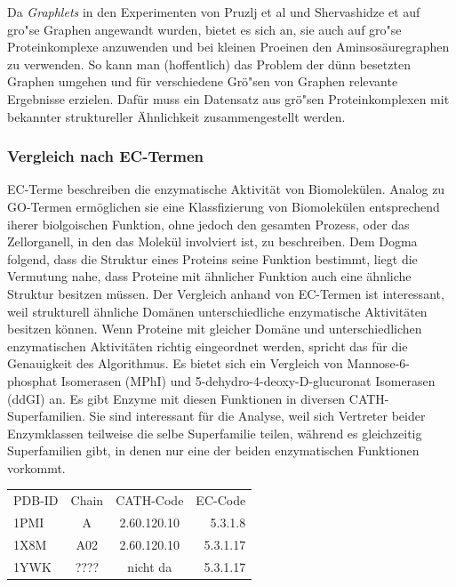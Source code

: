\documentclass{report}
\begin{document}
Da \textit{Graphlets} in den Experimenten von Pruzlj et al und Shervashidze et auf gro"se Graphen angewandt wurden, bietet es sich an, sie auch auf gro"se Proteinkomplexe anzuwenden und bei kleinen Proeinen den Aminsos\"auregraphen zu verwenden. So kann man (hoffentlich) das Problem der d\"unn besetzten Graphen umgehen und f\"ur verschiedene Gr\"o"sen von Graphen relevante Ergebnisse erzielen. Daf\"ur muss ein Datensatz aus gr\"o"sen Proteinkomplexen mit bekannter struktureller \"Ahnlichkeit zusammengestellt werden.

\subsubsection{Vergleich nach EC-Termen}

EC-Terme beschreiben die enzymatische Aktivit\"at von Biomolek\"ulen. Analog zu GO-Termen erm\"oglichen sie eine Klassfizierung von Biomolek\"ulen entsprechend iherer biolgoischen Funktion, ohne jedoch den gesamten Prozess, oder das Zellorganell, in den das Molek\"ul involviert ist, zu beschreiben. Dem Dogma folgend, dass die Struktur eines Proteins seine Funktion bestimmt, liegt die Vermutung nahe, dass Proteine mit \"ahnlicher Funktion auch eine \"ahnliche Struktur besitzen m\"ussen. Der Vergleich anhand von EC-Termen ist interessant, weil strukturell \"ahnliche Dom\"anen unterschiedliche enzymatische Aktivit\"aten besitzen k\"onnen. Wenn Proteine mit gleicher Dom\"ane und unterschiedlichen enzymatischen Aktivit\"aten richtig eingeordnet werden, spricht das f\"ur die Genauigkeit des Algorithmus. Es bietet sich ein Vergleich von Mannose-6-phosphat Isomerasen (MPhI) und 5-dehydro-4-deoxy-D-glucuronat Isomerasen (ddGI) an. Es gibt Enzyme mit diesen Funktionen in diversen CATH-Superfamilien. Sie sind interessant f\"ur die Analyse, weil sich Vertreter beider Enzymklassen teilweise die selbe Superfamilie teilen, w\"ahrend es gleichzeitig Superfamilien gibt, in denen nur eine der beiden enzymatischen Funktionen vorkommt.


\begin{tabular}{l c c r}

PDB-ID & Chain & CATH-Code   & EC-Code  \\
1PMI   & A     & 2.60.120.10 & 5.3.1.8  \\
1X8M   & A02   & 2.60.120.10 & 5.3.1.17 \\
1YWK   & ????  & nicht da    & 5.3.1.17

\end{tabular}
\end{document}
